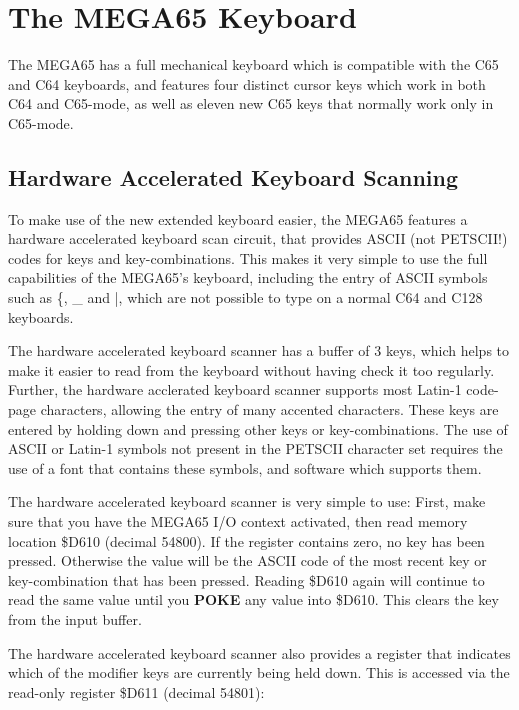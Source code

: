 
\chapter{The MEGA65 Keyboard}

The MEGA65 has a full mechanical keyboard which is compatible with the C65 and
C64 keyboards, and features four distinct cursor keys which work in both C64 and
C65-mode, as well as eleven new C65 keys that normally work only in C65-mode.

\section{Hardware Accelerated Keyboard Scanning}

To make use of the new extended keyboard easier, the MEGA65 features a hardware
accelerated keyboard scan circuit, that provides ASCII (not PETSCII!) codes for
keys and key-combinations.  This makes it very simple to use the full capabilities
of the MEGA65's keyboard, including the entry of ASCII symbols such as \{, \_ and |,
which are not possible to type on a normal C64 and C128 keyboards.

The hardware accelerated keyboard scanner has a buffer of 3 keys, which helps to
make it easier to read from the keyboard without having check it too regularly.
Further, the hardware acclerated keyboard scanner supports most Latin-1 code-page
characters, allowing the entry of many accented characters.  These keys are
entered by holding down \megasymbolkey and pressing other keys or key-combinations.
The use of ASCII or Latin-1 symbols not present in the PETSCII character set
requires the use  of a font that contains these symbols, and software which supports them.

The hardware accelerated keyboard scanner is very simple to use: First, make sure
that you have the MEGA65 I/O context activated, then read memory location \$D610
(decimal 54800). If the register contains zero, no key has been pressed.  Otherwise the
value will be the ASCII code of the most recent key or key-combination that has
been pressed.  Reading \$D610 again will continue to read the same value until
you {\bf POKE} any value into \$D610. This clears the key from the input buffer.

The hardware accelerated keyboard scanner also provides a register that
indicates which of the modifier keys are currently being held down.  This is
accessed via the read-only register \$D611 (decimal 54801):


